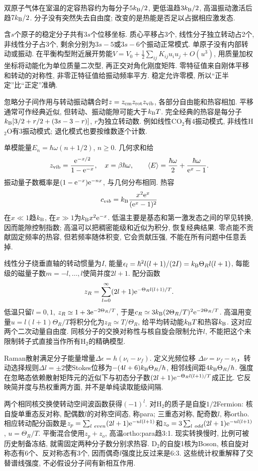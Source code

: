 \label{ch:molecule}
双原子气体在室温的定容热容约为每分子$5k_{\mathrm B}/2$, 更低温趋$3k_{\mathrm B}/2$, 高温振动激活后趋$7k_{\mathrm B}/2$. 分子没有突然失去自由度; 改变的是热能是否足以占据相应激发态.

含$s$个原子的稳定分子共有$3s$个位移坐标. 质心平移占3个, 线性分子独立转动占2个, 非线性分子占3个, 剩余分别为$3s-5$或$3s-6$个振动正常模式. 单原子没有内部转动或振动. 在平衡构型附近展开势能$V=V_0+\frac12\sum_{ij}K_{ij}u_iu_j+O(u^3)$, 用质量加权坐标将动能化为单位质量二次型, 再正交对角化刚度矩阵. 零特征值来自刚体平移和转动的对称性, 非零正特征值给振动频率平方. 稳定允许零模, 所以“正半定”比“正定”准确.

忽略分子间作用与转动振动耦合时$z=z_{\rm cm}z_{\rm rot}z_{\rm vib}$, 各部分自由能和热容相加. 平移通常可作经典近似, 但转动、振动能隙可能大于$k_{\mathrm B} T$. 完全经典的热容是每分子$k_{\mathrm B}[3/2+r/2+(3s-3-r)]$, $r$为独立转动数. 例如线性CO$_2$有4振动模式, 非线性H$_2$O有3振动模式; 退化模式也要按维数逐个计数.

单模能量$E_n=\hbar\omega(n+1/2)$, $n\ge0$. 几何求和给
\[
z_{\rm vib}=\frac{\mathrm e^{-x/2}}{1-\mathrm e^{-x}},\quad x=\beta\hbar\omega,\qquad
\langle E\rangle=\frac{\hbar\omega}2+\frac{\hbar\omega}{\mathrm e^x-1}.
\]
振动量子数概率是$(1-\mathrm e^{-x})\mathrm e^{-nx}$, 与几何分布相同. 热容
\[
c_{vib}=k_{\mathrm B}\frac{x^2\mathrm e^x}{(\mathrm e^x-1)^2}
\]
在$x\ll1$趋$k_{\mathrm B}$, 在$x\gg1$为$k_{\mathrm B} x^2\mathrm e^{-x}$. 低温主要是基态和第一激发态之间的罕见转换, 因而能隙控制指数; 高温可以把稠密能级和近似为积分, 恢复经典结果. 零点能不贡献固定频率的热容, 但若频率随体积变, 它会贡献压强, 不能在所有问题中任意丢掉.

线性分子绕垂直轴的转动惯量为$I$, 能量$\epsilon_l=\hbar^2l(l+1)/(2I)=k_{\mathrm B}\Theta_Rl(l+1)$, 每能级的磁量子数$m=-l,\ldots,l$使简并度$2l+1$. 配分函数
\[
z_R=\sum_{l=0}^{\infty}(2l+1)\mathrm e^{-\Theta_Rl(l+1)/T}.
\]
低温只留$l=0,1$, $z_R\simeq1+3\mathrm e^{-2\Theta_R/T}$, 于是$c_R\simeq3k_{\mathrm B}(2\Theta_R/T)^2\mathrm e^{-2\Theta_R/T}$. 高温用变量$u=l(l+1)\Theta_R/T$将积分化为$z_R\simeq T/\Theta_R$, 给平均转动能$k_{\mathrm B} T$和热容$k_{\mathrm B}$. 这对应两个二次动量自由度. 同核分子的交换对称性与核自旋会限制允许$l$, 不能把这个未限制转子式直接当作所有H$_2$的精确模型.

Raman散射满足分子能量增量$\Delta\epsilon=h(\nu_i-\nu_f)$. 定义光频位移 $\Delta\nu=\nu_f-\nu_i$，转动选择规则$\Delta l=\pm2$使Stokes位移为$-(4l+6)k_{\mathrm B}\Theta_R/h$, 相邻线间距$4k_{\mathrm B}\Theta_R/h$. 强度在忽略态依赖散射矩阵元的近似下与初态分子数$(2l+1)\mathrm e^{-\Theta_Rl(l+1)/T}$成正比. 它反映简并度与热权重两方面, 并不是单纯读取能级间隔.

两个相同核交换使转动空间波函数获得$(-1)^l$. 对H$_2$的质子是自旋$1/2$Fermion: 核自旋单重态反对称, 配偶数$l$的对称空间态, 称para; 三重态对称, 配奇数$l$, 称ortho. 相应转动配分函数是$z_p=\sum_{l\ {even}}(2l+1)\e^{-u l(l+1)}$和$z_o=3\sum_{l\ {odd}}(2l+1)\mathrm e^{-u l(l+1)}$, $u=\Theta_R/T$. 平衡混合使用$z_p+z_o$, 高温ortho:para趋3:1. 现实转换慢时, 比例可被历史制备冻结, 就需固定两种分子数分别求热容. D$_2$的自旋1核为Boson, 核自旋对称态有6个、反对称态有3个, 因而偶奇$l$强度比反过来是6:3. 这些统计权重解释了交替谱线强度, 不必假设分子间有新相互作用.
